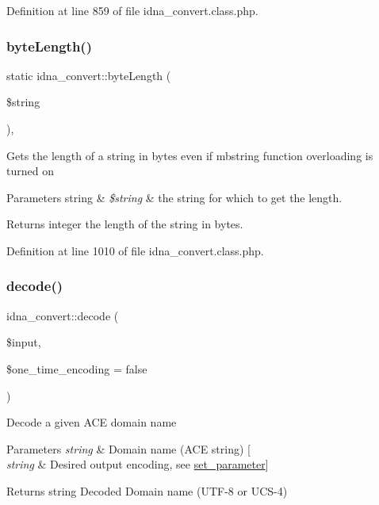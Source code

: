 Definition at line 859 of file idna\+\_\+convert.\+class.\+php.

\hypertarget{classidna__convert_a964eafd23cc4069f6aa9912bcdfb61c7}{}\label{classidna__convert_a964eafd23cc4069f6aa9912bcdfb61c7} 
\subsubsection{\texorpdfstring{byte\+Length()}{byteLength()}}
{\footnotesize\ttfamily static idna\+\_\+convert\+::byte\+Length (\begin{DoxyParamCaption}\item[{}]{\$string }\end{DoxyParamCaption})\hspace{0.3cm}{\ttfamily [static]}, {\ttfamily [protected]}}

Gets the length of a string in bytes even if mbstring function overloading is turned on


\begin{DoxyParams}[1]{Parameters}
string & {\em \$string} & the string for which to get the length. \\
\hline
\end{DoxyParams}
\begin{DoxyReturn}{Returns}
integer the length of the string in bytes. 
\end{DoxyReturn}


Definition at line 1010 of file idna\+\_\+convert.\+class.\+php.

\hypertarget{classidna__convert_a845094b11b91976cea00bd9b9e022cd5}{}\label{classidna__convert_a845094b11b91976cea00bd9b9e022cd5} 
\subsubsection{\texorpdfstring{decode()}{decode()}}
{\footnotesize\ttfamily idna\+\_\+convert\+::decode (\begin{DoxyParamCaption}\item[{}]{\$input,  }\item[{}]{\$one\+\_\+time\+\_\+encoding = {\ttfamily false} }\end{DoxyParamCaption})}

Decode a given A\+CE domain name 
\begin{DoxyParams}{Parameters}
{\em string} & Domain name (A\+CE string) \mbox{[}\\
\hline
{\em string} & Desired output encoding, see \hyperlink{classidna__convert_a1efc37a8bd5f6b08eed75e0b8e6f074d}{set\+\_\+parameter}\mbox{]} \\
\hline
\end{DoxyParams}
\begin{DoxyReturn}{Returns}
string Decoded Domain name (U\+T\+F-\/8 or U\+C\+S-\/4) 
\end{DoxyReturn}


